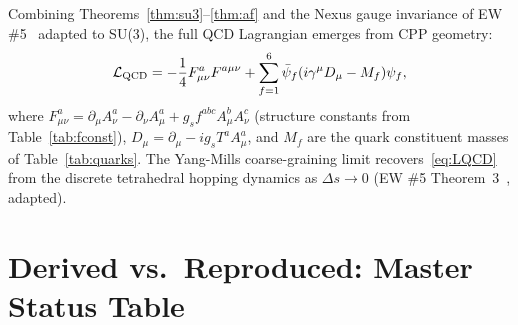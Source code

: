 \documentclass[11pt,letterpaper]{article}
\begin{document}
Combining Theorems~\ref{thm:su3}--\ref{thm:af} and the
Nexus gauge invariance of EW \#5~\citep{cpp_ew5} adapted to SU(3),
the full QCD Lagrangian emerges from CPP geometry:
\begin{equation}
\mathcal{L}_{\rm QCD}
= -\frac{1}{4}F^a_{\mu\nu}F^{a\mu\nu}
+ \sum_{f=1}^{6}\bar{\psi}_f(i\gamma^\mu D_\mu - M_f)\psi_f,
\label{eq:LQCD}
\end{equation}
where $F^a_{\mu\nu} = \partial_\mu A^a_\nu - \partial_\nu A^a_\mu
+ g_s f^{abc}A^b_\mu A^c_\nu$ (structure constants from
Table~\ref{tab:fconst}), $D_\mu = \partial_\mu - ig_s T^a A^a_\mu$,
and $M_f$ are the quark constituent masses of Table~\ref{tab:quarks}.
The Yang-Mills coarse-graining limit recovers~\eqref{eq:LQCD} from
the discrete tetrahedral hopping dynamics as $\Delta s \to 0$
(EW \#5 Theorem~3~\citep{cpp_ew5}, adapted).

\section{Derived vs.\ Reproduced: Master Status Table}
\label{sec:status}
\end{document}
